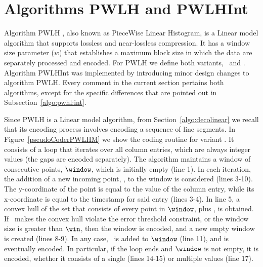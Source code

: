 

\section{Algorithms PWLH and PWLHInt}
\label{algo:pwlh}


Algorithm PWLH \cite{coder:pwlh}, also known as PieceWise Linear Histogram, is a Linear model algorithm that supports lossless and near-lossless compression. It has a window size parameter ($w$) that establishes a maximum block size in which the data are separately processed and encoded. For PWLH we define both variants, \maskalgo\ and \NOmaskalgo. Algorithm PWLHInt was implemented by introducing minor design changes to algorithm PWLH. Every comment in the current section pertains both algorithms, except for the specific differences that are pointed out in Subsection~\ref{algo:pwhl:int}.


Since PWLH is a Linear model algorithm, from Section~\ref{algo:decolinear} we recall that its encoding process involves encoding a sequence of line segments. In Figure~\ref{pseudoCoderPWLHM} we show the coding routine for variant \maskalgo. It consists of a loop that iterates over all column entries, which are always integer values (the gaps are encoded separately). The algorithm maintains a window of consecutive points, $\window$, which is initially empty (line 1). In each iteration, the addition of a new incoming point, \point, to the window is considered (lines 3-10). The y-coordinate of the point is equal to the value of the column entry, while its x-coordinate is equal to the timestamp for said entry (lines 3-4). In line 5, a convex hull of the set that consists of every point in $\window$, plus \point, is obtained. If \point\ makes the convex hull violate the error threshold constraint, or the window size is greater than $\win$, then the window is encoded, and a new empty window is created (lines 8-9). In any case, \point\ is added to $\window$ (line 11), and is eventually encoded. In particular, if the loop ends and $\window$ is not empty, it is encoded, whether it consists of a single (lines 14-15) or multiple values (line 17).


\clearpage





